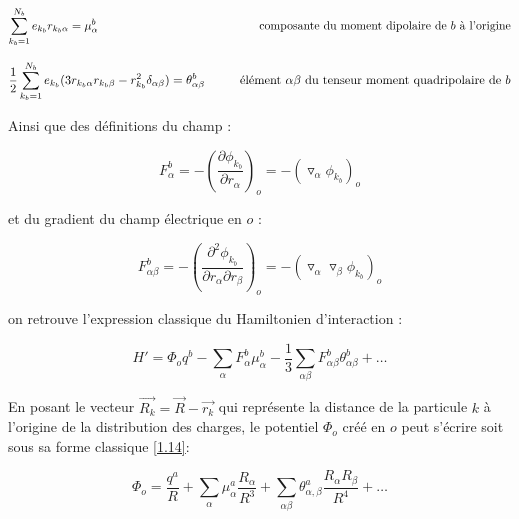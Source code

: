 	\begin{flushleft}
		\begin{equation*}
		\sum_{k_{b}=1}^{N_{b}} e_{k_{b}} r_{k_{b}\alpha} = \mu_{\alpha}^{b}  \hspace{4.8cm} \textup{composante du moment dipolaire de $b$ à l'origine}
		\end{equation*}
	\end{flushleft}
	
	
	\begin{flushleft}
		\begin{equation*}
		\frac{1}{2} \sum_{k_{b}=1}^{N_{b}} e_{k_{b}} (3r_{k_{b}\alpha} r_{k_{b}\beta}- r^{2}_{k_{b}}\delta_{\alpha \beta}) = \theta_{\alpha \beta}^{b}  \hspace{1cm} \textup{élément $\alpha\beta$ du tenseur moment quadripolaire de $b$}
		\end{equation*}
	\end{flushleft}
	
	Ainsi que des définitions du champ :
	
	\begin{equation}
	F_{\alpha}^{b} = - \left(\frac{\partial \phi_{k_{b}}}{\partial r_{\alpha}}\right)_{o} = - (\triangledown_{\alpha} \phi_{k_{b}})_{o} \label{1.11}
	\end{equation}
	
	et du gradient du champ électrique en $o$ : 
	
	\begin{equation}
	F_{\alpha\beta}^{b} = - \left(\frac{\partial^{2} \phi_{k_{b}}}{\partial r_{\alpha} \partial r_{\beta}}\right)_{o} = - (\triangledown_{\alpha} \triangledown_{\beta} \phi_{k_{b}})_{o} \label{1.12}
	\end{equation}
	
	on retrouve l'expression classique du Hamiltonien d'interaction : 
	
	\begin{equation}
	H' = \Phi_{o} q^{b} - \sum_{\alpha} F_{\alpha}^{b} \mu_{\alpha}^{b} - \frac{1}{3} \sum_{\alpha\beta} F_{\alpha\beta}^{b} \theta_{\alpha\beta}^{b} + \ldots
	\end{equation}
	
	En posant le vecteur $\overrightarrow{R_{k}}= \overrightarrow{R} - \overrightarrow{r_{k}}$ qui représente la distance de la particule $k$ à l'origine de la distribution des charges, le potentiel $\Phi_{o}$ créé en $o$ peut s'écrire soit sous sa forme classique \ref{1.14}:
	
	\begin{equation}
	\Phi_{o} = \frac{q^{a}}{R} + \sum_{\alpha} \mu_{\alpha}^{a} \frac{R_{\alpha}}{R^{3}} + \sum_{\alpha\beta} \theta_{\alpha,\beta}^{a} \frac{R_{\alpha} R_{\beta}}{R^{4}} + \ldots \label{1.14}
	\end{equation}
	
